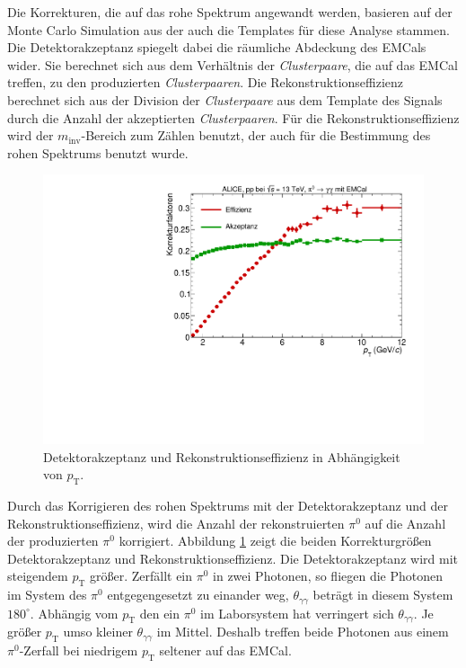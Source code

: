 Die Korrekturen, die auf das rohe Spektrum angewandt werden, basieren auf der Monte Carlo Simulation aus der auch die Templates für diese Analyse stammen.
\newline
Die Detektorakzeptanz spiegelt dabei die räumliche Abdeckung des EMCals wider.
Sie berechnet sich aus dem Verhältnis der \textit{Clusterpaare}, die auf das EMCal treffen, zu den produzierten \textit{Clusterpaaren}.
\newline
Die Rekonstruktionseffizienz berechnet sich aus der Division der \textit{Clusterpaare} aus dem Template des Signals durch die Anzahl der akzeptierten \textit{Clusterpaaren}.
Für die Rekonstruktionseffizienz wird der $m_\text{inv}$-Bereich zum Zählen benutzt, der auch für die Bestimmung des rohen Spektrums benutzt wurde.
\begin{figure}[t] %
\centering
\includegraphics[width=.65\linewidth]{Korrekturfaktoren_Data_2016.pdf}
\caption{Detektorakzeptanz und Rekonstruktionseffizienz in Abhängigkeit von $p_\text{T}$.
}
\label{fig:Korrekturen}
\end{figure}
\newline
Durch das Korrigieren des rohen Spektrums mit der Detektorakzeptanz und der Rekonstruktionseffizienz, wird die Anzahl der rekonstruierten $\pi^{0}$ auf die Anzahl der produzierten $\pi^{0}$ korrigiert.
Abbildung \ref{fig:Korrekturen} zeigt die beiden Korrekturgrößen Detektorakzeptanz und Rekonstruktionseffizienz.
\newline
Die Detektorakzeptanz wird mit steigendem $p_\text{T}$ größer.
Zerfällt ein $\pi^{0}$ in zwei Photonen, so fliegen die Photonen im System des $\pi^{0}$ entgegengesetzt zu einander weg, $\theta_{\gamma\gamma}$ beträgt in diesem System $180^{\circ}$.
Abhängig vom $p_\text{T}$ den ein $\pi^{0}$ im Laborsystem hat verringert sich $\theta_{\gamma\gamma}$.
Je größer $p_\text{T}$ umso kleiner $\theta_{\gamma\gamma}$ im Mittel.
Deshalb treffen beide Photonen aus einem $\pi^{0}$-Zerfall bei niedrigem $p_\text{T}$ seltener auf das EMCal.
